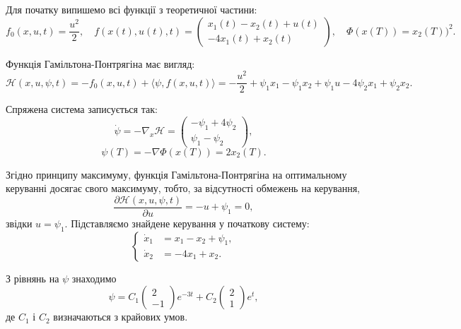 \begin{solution}
    Для початку випишемо всі функції з теоретичної частини:
	\begin{equation}
		f_0(x, u, t) = \dfrac{u^2}{2}, \quad f(x(t), u(t), t) = \begin{pmatrix} x_1(t) - x_2(t) + u(t) \\ -4x_1(t) + x_2(t) \end{pmatrix}, \quad \Phi(x(T)) = x_2(T))^2.
	\end{equation}
	
	Функція Гамільтона-Понтрягіна має вигляд:
	\begin{equation}
		\mathcal{H}(x, u, \psi, t) = - f_0(x, u, t) + \langle \psi, f(x, u, t) \rangle = -\dfrac{u^2}{2} + \psi_1 x_1 - \psi_1 x_2 + \psi_1 u - 4 \psi_2 x_1 + \psi_2 x_2.
	\end{equation}

	Спряжена система записується так:
	\begin{equation}
		\dot \psi = - \nabla_x \mathcal{H} = \begin{pmatrix} - \psi_1 + 4 \psi_2 \\ \psi_1 - \psi_2 \end{pmatrix},
	\end{equation}
	\begin{equation}
		\psi(T) = - \nabla \Phi(x(T)) = 2 x_2(T).
	\end{equation}

	Згідно принципу максимуму, функція Гамільтона-Понтрягіна на оптимальному керуванні досягає свого максимуму, тобто, за відсутності обмежень на керування,
	\begin{equation}
		\dfrac{\partial \mathcal{H}(x, u, \psi, t)}{\partial u} = - u + \psi_1 = 0,
	\end{equation}
	звідки $u = \psi_1$. Підставляємо знайдене керування у початкову систему:
	\[ \left\{ \begin{aligned}
		\dot x_1 &= x_1 - x_2 + \psi_1, \\
		\dot x_2 &= - 4 x_1 + x_2.
	\end{aligned} \right. \]

 	З рівнянь на $\psi$ знаходимо
 	\begin{equation}
 	    \psi = C_1 \begin{pmatrix} 2 \\ -1 \end{pmatrix} e^{-3t} + C_2 \begin{pmatrix} 2 \\ 1 \end{pmatrix} e^{t},
 	\end{equation}
 	де $C_1$ і $C_2$ визначаються з крайових умов. \\


\end{solution}
